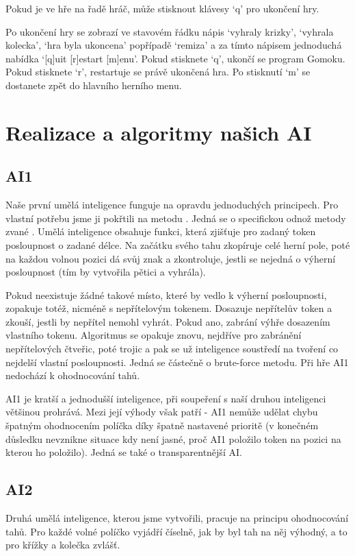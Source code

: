 \documentclass[a4paper,11pt,titlepage]{article}
\begin{document}
Pokud je ve hře na řadě hráč, může stisknout klávesy `q' pro ukončení hry.

Po ukončení hry se zobrazí ve stavovém řádku nápis `vyhraly krizky', `vyhrala kolecka', `hra byla ukoncena' popřípadě `remiza' a za tímto nápisem jednoduchá nabídka `[q]uit [r]estart [m]enu'. Pokud stisknete `q', ukončí se program Gomoku. Pokud stisknete `r', restartuje se právě ukončená hra. Po stisknutí `m' se dostanete zpět do hlavního herního menu.
\newpage
\section{Realizace a algoritmy našich AI}
\subsection{AI1}
Naše první umělá inteligence funguje na opravdu jednoduchých principech. Pro vlastní potřebu jsme ji pokřtili na metodu . Jedná se o spe\-ci\-fic\-kou od\-nož me\-to\-dy zva\-né . Umělá inteligence obsahuje funkci, která zjišťuje pro zadaný token posloupnost o zadané délce. Na začátku svého tahu zkopíruje celé herní pole, poté na každou volnou pozici dá svůj znak a zkontroluje, jestli se nejedná o výherní posloupnost (tím by vytvořila pětici a vyhrála). 

Pokud neexistuje žádné takové místo, které by vedlo k výherní posloupnosti, zopakuje totéž, nicméně s nepřítelovým tokenem. Dosazuje nepřítelův token a zkouší, jestli by nepřítel nemohl vyhrát. Pokud ano, zabrání výhře dosazením vlastního tokenu. Algoritmus se opakuje znovu, nejdříve pro za\-brá\-ně\-ní nepřítelových čtveřic, poté trojic a pak se už inteligence soustředí na tvoření co nejdelší vlastní posloupnosti. Jedná se částečně o brute-force metodu. Při hře AI1 nedochází k ohodnocování tahů.

AI1 je kratší a jednodušší inteligence, při soupeření s naší druhou inteligenci většinou prohrává. Mezi její výhody však patří  - AI1 nemůže udělat chybu špatným ohodnocením políčka díky špatně nastavené prioritě (v konečném důsledku nevznikne situace kdy není jasné, proč AI1 položilo token na pozici na kterou ho položilo). Jedná se také o transparentnější AI.
\subsection{AI2}
Druhá umělá inteligence, kterou jsme vytvořili, pracuje na principu ohodnocování tahů. Pro každé volné políčko vyjádří číselně, jak by byl tah na něj výhodný, a to pro křížky a kolečka zvlášť.
\end{document}
